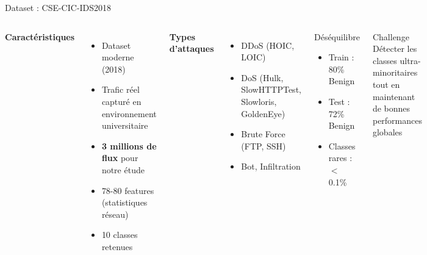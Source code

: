 ﻿\documentclass[aspectratio=169]{beamer}
\begin{document}
\begin{frame}{Dataset : CSE-CIC-IDS2018}
\begin{columns}[T]
\textbf{Caractéristiques}
\begin{itemize}
    \item Dataset moderne (2018)
    \item Trafic réel capturé en environnement universitaire
    \item \textcolor{accentorange}{\textbf{3 millions de flux}} pour notre étude
    \item 78-80 features (statistiques réseau)
    \item 10 classes retenues
\end{itemize}

\vspace{0.3cm}
\textbf{Types d'attaques}
\begin{itemize}
    \item DDoS (HOIC, LOIC)
    \item DoS (Hulk, SlowHTTPTest, Slowloris, GoldenEye)
    \item Brute Force (FTP, SSH)
    \item Bot, Infiltration
\end{itemize}

\begin{block}{Déséquilibre}
\begin{itemize}
    \item Train : 80\% Benign
    \item Test : 72\% Benign
    \item Classes rares : $<$ 0.1\%
\end{itemize}
\end{block}

\vspace{0.3cm}
\begin{exampleblock}{Challenge}
Détecter les classes ultra-minoritaires tout en maintenant de bonnes performances globales
\end{exampleblock}
\end{columns}
\end{frame}
\end{document}
